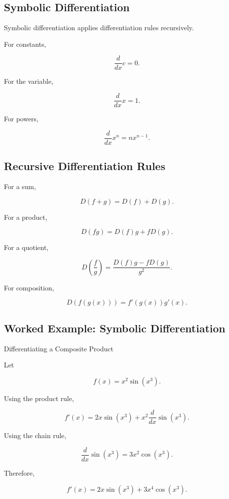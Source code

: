 \subsection{Symbolic Differentiation}
\label{subsec:symbolic-differentiation}

Symbolic differentiation applies differentiation rules recursively.

For constants,

\[
\boxed{
\frac{d}{dx}c
=
0.
}
\]

For the variable,

\[
\boxed{
\frac{d}{dx}x
=
1.
}
\]

For powers,

\[
\boxed{
\frac{d}{dx}x^n
=
nx^{n-1}.
}
\]

\subsection{Recursive Differentiation Rules}
\label{subsec:recursive-differentiation-rules}

For a sum,

\[
\boxed{
D(f+g)
=
D(f)+D(g).
}
\]

For a product,

\[
\boxed{
D(fg)
=
D(f)g
+
fD(g).
}
\]

For a quotient,

\[
\boxed{
D
\left(
\frac{f}{g}
\right)
=
\frac{
D(f)g-fD(g)
}{
g^2
}.
}
\]

For composition,

\[
\boxed{
D
(
f(g(x))
)
=
f'(g(x))g'(x).
}
\]

\subsection{Worked Example: Symbolic Differentiation}
\label{subsec:worked-symbolic-differentiation}

\begin{workedexamplebox}{Differentiating a Composite Product}

Let

\[
f(x)
=
x^2\sin(x^3).
\]

Using the product rule,

\[
f'(x)
=
2x\sin(x^3)
+
x^2
\frac{d}{dx}
\sin(x^3).
\]

Using the chain rule,

\[
\frac{d}{dx}
\sin(x^3)
=
3x^2\cos(x^3).
\]

Therefore,

\begin{answerbox}
\[
\boxed{
f'(x)
=
2x\sin(x^3)
+
3x^4\cos(x^3).
}
\]
\end{answerbox}

\end{workedexamplebox}


